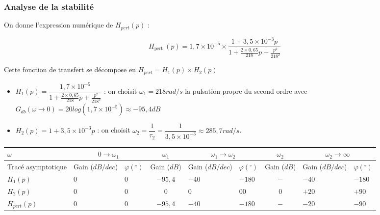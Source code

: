 \subsubsection{Analyse de la stabilité}


On donne l'expression numérique de $H_{p e r t}(p)$ :

$$
H_{\text {pert }}(p)=1,7 \times 10^{-5} \times \frac{1+3,5 \times 10^{-3} p}{1+\frac{2 \times 0,65}{218} p+\frac{p^{2}}{218^{2}}}
$$


\fi



\ifprof
\begin{texteCache}

%

Cette fonction  de transfert se décompose en $H_{pert}=H_1(p)\times H_2(p)$

\begin{itemize}
\item $H_1(p)=\dfrac{1,7 \times 10^{-5}}{1+\frac{2 \times 0,65}{218} p+\frac{p^{2}}{218^{2}}}$ : on choisit $\omega_1=218 rad/s$ la pulsation propre du second ordre avec $G_{db}(\omega \to 0)=20log(1,7 \times 10^{-5})\approx -95,4dB$
\item $H_2(p)=1+3,5 \times 10^{-3} p$ : on choisit $\omega_2=\dfrac{1}{\tau_2}=\dfrac{1}{3,5 \times 10^{-3}}\approx 285,7 rad/s$.
\end{itemize}

\renewcommand{\arraystretch}{3}

\begin{center}
\begin{tabular}{|p{}|p{1.5cm}|p{}|c|p{1.5cm}|p{}|c|p{1.5cm}|p{}|}
\hline 
$\omega$& \multicolumn{2}{c|}{$0\to \omega_1$}   & $\omega_1$ &  \multicolumn{2}{c|}{$\omega_1\to \omega_2$}  & $\omega_2$ &   \multicolumn{2}{c|}{$\omega_2 \to \infty$}\\ 
\hline 
Tracé asymptotique &Gain ($dB/dec$) & $\varphi (^\circ)$ & Gain ($dB$) & Gain ($dB/dec$) & $\varphi (^\circ)$ & Gain ($dB$) & Gain ($dB/dec$) & $\varphi (^\circ)$  \\ 
\hline 
$H_1(p)$ & $0$&$0$&$-95,4$&$-40$ & $-180$ & $-$ & $-40$ & $-180$  \\ 
\hline 
$H_2(p)$ & $0$& $0$& $0$ & $0$ & $00$ & $0$ & $+20$ & $+90$  \\ 
\hline 
\hline
$H_{pert}(p)$ &$0$& $0$ &$-95,4$ & $-40$ & $-180$ & $-$ & $-20$ & $-90$  \\ 
\hline 
\end{tabular} 
\end{center}


\end{texteCache}



